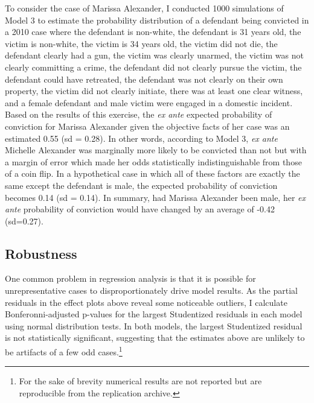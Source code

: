 \documentclass[12pt,article]{article}
\begin{document}
To consider the case of Marissa Alexander, I conducted 1000 simulations
of Model 3 to estimate the probability distribution of a defendant being
convicted in a 2010 case where the defendant is non-white, the defendant
is 31 years old, the victim is non-white, the victim is 34 years old,
the victim did not die, the defendant clearly had a gun, the victim was
clearly unarmed, the victim was not clearly committing a crime, the
defendant did not clearly pursue the victim, the defendant could have
retreated, the defendant was not clearly on their own property, the
victim did not clearly initiate, there was at least one clear witness,
and a female defendant and male victim were engaged in a domestic
incident. Based on the results of this exercise, the \emph{ex ante}
expected probability of conviction for Marissa Alexander given the
objective facts of her case was an estimated 0.55 (sd = 0.28). In other
words, according to Model 3, \emph{ex ante} Michelle Alexander was
marginally more likely to be convicted than not but with a margin of
error which made her odds statistically indistinguishable from those of
a coin flip. In a hypothetical case in which all of these factors are
exactly the same except the defendant is male, the expected probability
of conviction becomes 0.14 (sd = 0.14). In summary, had Marissa
Alexander been male, her \emph{ex ante} probability of conviction would
have changed by an average of -0.42 (sd=0.27).

\subsection{Robustness}\label{robustness}

One common problem in regression analysis is that it is possible for
unrepresentative cases to disproportionately drive model results. As the
partial residuals in the effect plots above reveal some noticeable
outliers, I calculate Bonferonni-adjusted p-values for the largest
Studentized residuals in each model using normal distribution tests. In
both models, the largest Studentized residual is not statistically
significant, suggesting that the estimates above are unlikely to be
artifacts of a few odd cases.\footnote{For the sake of brevity numerical
  results are not reported but are reproducible from the replication
  archive.}
\end{document}
